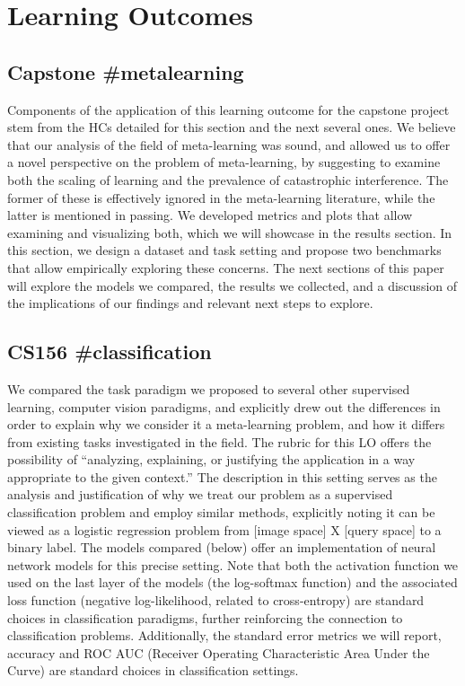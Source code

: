 \section{Learning Outcomes}

\subsection{Capstone \#metalearning}
Components of the application of this learning outcome for the capstone project stem from the HCs detailed for this section and the next several ones. We believe that our analysis of the field of meta-learning was sound, and allowed us to offer a novel perspective on the problem of meta-learning, by suggesting to examine both the scaling of learning and the prevalence of catastrophic interference. The former of these is effectively ignored in the meta-learning literature, while the latter is mentioned in passing. We developed metrics and plots that allow examining and visualizing both, which we will showcase in the results section. In this section, we design a dataset and task setting and propose two benchmarks that allow empirically exploring these concerns. The next sections of this paper will explore the models we compared, the results we collected, and a discussion of the implications of our findings and relevant next steps to explore.

\subsection{CS156 \#classification}
We compared the task paradigm we proposed to several other supervised learning, computer vision paradigms, and explicitly drew out the differences in order to explain why we consider it a meta-learning problem, and how it differs from existing tasks investigated in the field. The rubric for this LO offers the possibility of ``analyzing, explaining, or justifying the application in a way appropriate to the given context.'' The description in this setting serves as the analysis and justification of why we treat our problem as a supervised classification problem and employ similar methods, explicitly noting it can be viewed as a logistic regression problem from [image space] X [query space] to a binary label. The models compared (below) offer an implementation of neural network models for this precise setting. Note that both the activation function we used on the last layer of the models (the log-softmax function) and the associated loss function (negative log-likelihood, related to cross-entropy) are standard choices in classification paradigms, further reinforcing the connection to classification problems. Additionally, the standard error metrics we will report, accuracy and ROC AUC (Receiver Operating Characteristic Area Under the Curve) are standard choices in classification settings.

